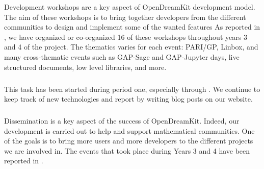 Development workshops are a key aspect of OpenDreamKit development model. The aim of these workshops is to bring together developers from the different communities to design and implement some
of the wanted features%
As reported in , we have organized
or co-organized 16  of these workshops throughout years 3 and 4 of the project. The thematics varies
for each event: PARI/GP, Linbox, and many cross-thematic events such as GAP-Sage and GAP-Jupyter days,
live structured documents, low level libraries, and more.%

\subparagraph{}

This task has been started during period one, especially through . We continue
to keep track of new technologies and report by writing blog posts on our website.


\subparagraph{}
\label{dissem@dissemination}

Dissemination is a key aspect of the success of OpenDreamKit. Indeed, our development is carried
out to help and support mathematical communities. One of the goals is to bring
more users and more developers to the different projects we are involved in. The events
that took place during Years 3 and 4 have been reported in .%

